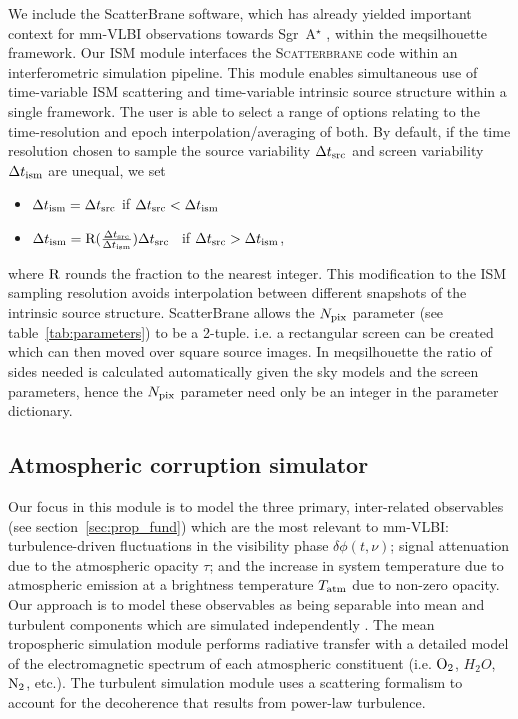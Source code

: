 We include the {\sc ScatterBrane} software, which has already yielded important context for mm-VLBI observations towards Sgr~A$^\star$ \citep[e.g.][]{Ortiz_2016}, within the {\sc meqsilhouette} framework. Our ISM module interfaces the \textsc{Scatterbrane} code within an interferometric simulation pipeline. This module enables simultaneous use of time-variable ISM scattering and time-variable intrinsic source structure within a single framework. The user is able to select a range of options relating to the time-resolution and epoch interpolation/averaging of both. By default, if the time resolution chosen to sample the source variability $\Delta t_{\rm src}$ and screen variability $\Delta t_{\rm ism}$ are unequal, we set  
\begin{itemize}
 \setlength\itemsep{1em}
\item $\Delta t_{\rm ism}=\Delta t_{\rm src}$ \qquad \qquad if \qquad  $\Delta t_{\rm src} < \Delta t_{\rm ism}$
\item $\Delta t_{\rm ism}={\rm R}(\frac{\Delta t_{\rm src}}{\Delta t_{\rm ism}})\Delta t_{\rm src}$ \ if \qquad  $\Delta t_{\rm src} > \Delta t_{\rm ism}$,
\end{itemize}
where ${\rm R}$ rounds the fraction to the nearest integer.  This modification to the ISM sampling resolution avoids interpolation between different snapshots of the intrinsic source structure.  {\sc ScatterBrane} allows the $N_{\rm pix}$ parameter (see table~\ref{tab:parameters}) to be a 2-tuple. i.e. a rectangular screen can be created which can then moved over square source images. In {\sc meqsilhouette} the ratio of sides needed is calculated automatically given the sky models and the screen parameters, hence the $N_{\rm pix}$ parameter need only be an integer in the parameter dictionary. 


\subsection{Atmospheric corruption simulator}\label{sec:trop_imp}

Our focus in this module is to model the three primary, inter-related observables (see section~\ref{sec:prop_fund}) which are the most relevant to mm-VLBI: turbulence-driven fluctuations in the visibility phase $\delta \phi(t,\nu)$; signal attenuation due to the atmospheric opacity $\tau$; and the increase in system temperature due to atmospheric emission at a brightness temperature $T_{\rm atm}$ due to non-zero opacity. Our approach is to model these observables as being separable into mean and turbulent components which are simulated independently \citep{Blecher_2016}. The mean tropospheric simulation module performs radiative transfer with a detailed model of the electromagnetic spectrum of each atmospheric constituent (i.e. ${\rm O_2}$, {\rm $H_2O$}, ${\rm N_2}$, etc.). The turbulent simulation module uses a scattering formalism to account for the decoherence that results from power-law turbulence.

